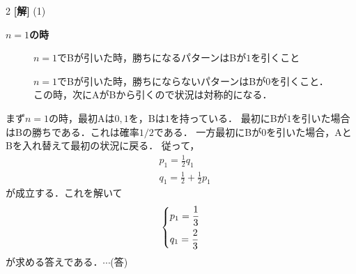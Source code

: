 \documentclass[../../../../main.tex]{subfiles}
\begin{document}
\setcounter{equation}{0}
\begin{oframed}
    
\end{oframed}
\setlength{\columnseprule}{0.4pt}
\begin{multicols}{2}
    {\bf[解]}
    (1)

    \textbf{$n=1$の時}

    \begin{figure}[H]
        \centering
        \caption{$n=1$でBが引いた時，勝ちになるパターンはBが$1$を引くこと}
    \end{figure}

    \begin{figure}[H]
        \centering
        \caption{$n=1$でBが引いた時，勝ちにならないパターンはBが$0$を引くこと．
            この時，次にAがBから引くので状況は対称的になる．}
    \end{figure}

    まず$n=1$の時，最初Aは$0,1$を，Bは$1$を持っている．
    最初にBが$1$を引いた場合はBの勝ちである．これは確率$1/2$である．
    一方最初にBが$0$を引いた場合，AとBを入れ替えて最初の状況に戻る．
    従って，
    \begin{align*}
         & p_1 = \frac{1}{2}q_1             \\
         & q_1 = \frac{1}{2}+\frac{1}{2}p_1
    \end{align*}
    が成立する．これを解いて
    \begin{align*}
        \begin{dcases}
            p_1 = \frac{1}{3} \\
            q_1 = \frac{2}{3}
        \end{dcases}
    \end{align*}
    が求める答えである．$\cdots$(答)


\end{multicols}
\end{document}
